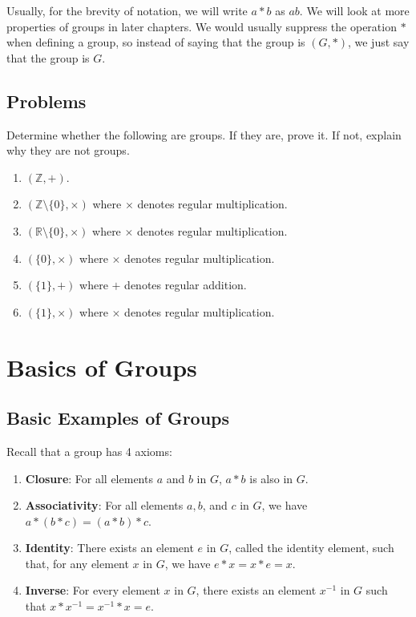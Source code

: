 \newpage

Usually, for the brevity of notation, we will write $a \ast b$ as $ab$. We will look at more properties of groups in later chapters. We would usually suppress the operation $\ast$ when defining a group, so instead of saying that the group is $(G, \ast)$, we just say that the group is $G$.

\newpage

\section{Problems}
\begin{problem}
Determine whether the following are groups. If they are, prove it. If not, explain why they are not groups.
\begin{enumerate}[label=(\alph*)]
    \item $(\mathbb{Z}, +)$.
    \item $(\mathbb{Z} \setminus \{0\}, \times)$ where $\times$ denotes regular multiplication.
    \item $(\mathbb{R} \setminus \{0\}, \times)$ where $\times$ denotes regular multiplication.
    \item $(\{0\}, \times)$ where $\times$ denotes regular multiplication.
    \item $(\{1\}, +)$ where $+$ denotes regular addition.
    \item $(\{1\}, \times)$ where $\times$ denotes regular multiplication.
\end{enumerate}
\end{problem}

\chapter{Basics of Groups}
\section{Basic Examples of Groups}
Recall that a group has 4 axioms:
\begin{enumerate}
    \item \textbf{Closure}: For all elements $a$ and $b$ in $G$, $a \ast b$ is also in $G$.
    \item \textbf{Associativity}: For all elements $a, b$, and $c$ in $G$, we have $a \ast (b \ast c) = (a \ast b) \ast c$.
    \item \textbf{Identity}: There exists an element $e$ in $G$, called the identity element, such that, for any element $x$ in $G$, we have $e \ast x = x \ast e = x$.
    \item \textbf{Inverse}: For every element $x$ in $G$, there exists an element $x^{-1}$ in $G$ such that $x \ast x^{-1} = x^{-1} \ast x = e$.
\end{enumerate}

